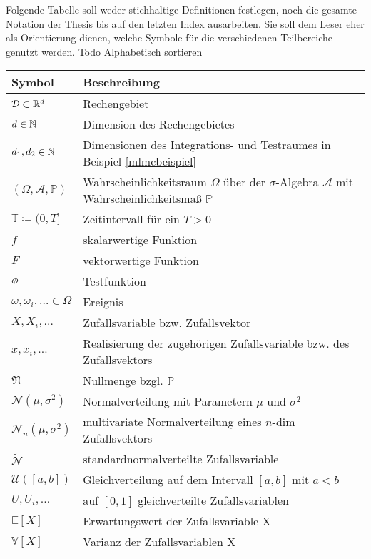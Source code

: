 Folgende Tabelle soll weder stichhaltige Definitionen festlegen, noch die gesamte Notation der Thesis bis auf den letzten Index ausarbeiten. Sie soll dem Leser eher als Orientierung dienen, welche Symbole für die verschiedenen Teilbereiche genutzt werden.
Todo Alphabetisch sortieren

\begin{tabular}[c]{ p{} p{}}
	\hline
	Symbol    & Beschreibung   \\
	\hline
	$ \mathcal{D} \subset \mathbb{R}^d$      & Rechengebiet       \\
	$ d \in \mathbb{N} $      & Dimension des Rechengebietes        \\
	$ d_1, d_2 \in \mathbb{N} $ & Dimensionen des Integrations- und Testraumes in Beispiel \ref{mlmcbeispiel}  \\
	$ (\Omega,\mathcal{A},\mathbb{P}) $       & Wahrscheinlichkeitsraum $ \Omega $ über der $ \sigma $-Algebra $ \mathcal{A} $ mit Wahrscheinlichkeitsmaß $ \mathbb{P} $       \\
	$ \mathbb{T} \coloneqq  (0,T]  $  &  Zeitintervall für ein $ T>0 $       \\
	$ f $ & skalarwertige Funktion \\
	$ F $ & vektorwertige Funktion \\
	$ \phi $ & Testfunktion \\
	$ \omega ,\omega_i , \dots \in \Omega $ & Ereignis \\
	$ X , X_i , \dots $ & Zufallsvariable bzw. Zufallsvektor \\
	$ x , x_i , \dots $ & Realisierung der zugehörigen Zufallsvariable bzw. des Zufallsvektors \\
	$ \mathfrak{N} $ & Nullmenge bzgl. $ \mathbb{P} $ \\
	$ \mathcal{N}(\mu,\sigma^2) $ & Normalverteilung mit Parametern $ \mu $ und $ \sigma^2 $ \\
	$ \mathcal{N}_n(\mu,\sigma^2) $ & multivariate Normalverteilung eines $ n $-dim Zufallsvektors\\
	$\widetilde{\mathcal{N}}$ & standardnormalverteilte Zufallsvariable \\
	$ \mathcal{U}([a,b]) $ & Gleichverteilung auf dem Intervall $ [a,b] $ mit $ a<b $ \\
	$ U,U_i,\dots $ &  auf $ [0,1] $  gleichverteilte Zufallsvariablen \\
	$ \mathbb{E}[X] $ & Erwartungswert der Zufallsvariable X \\
	$ \mathbb{V}[X] $ & Varianz der Zufallsvariablen X \\

\end{tabular}
